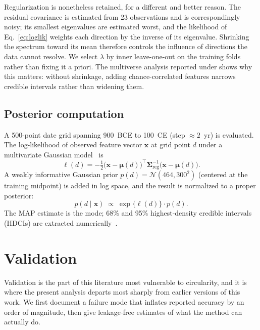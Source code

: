 \documentclass[10pt,letterpaper]{article}
\newcommand{\Smat}{\boldsymbol{\Sigma}}
\newcommand{\muvec}{\boldsymbol{\mu}}
\newcommand{\xvec}{\mathbf{x}}
\begin{document}
Regularization is nonetheless retained, for a different and better reason.
The residual covariance is estimated from 23 observations and is
correspondingly noisy; its smallest eigenvalues are estimated worst, and
the likelihood of Eq.~\ref{eq:loglik} weights each direction by the inverse
of its eigenvalue.  Shrinking the spectrum toward its mean therefore
controls the influence of directions the data cannot resolve.  We select
$\lambda$ by inner leave-one-out on the training folds rather than fixing
it a priori.  The multiverse analysis reported under 
shows why this matters: without shrinkage, adding chance-correlated
features narrows credible intervals rather than widening them.

\subsection*{Posterior computation}

A 500-point date grid spanning 900~BCE to 100~CE (step $\approx 2$~yr)
is evaluated.  The log-likelihood of observed feature vector $\xvec$
at grid point $d$ under a multivariate Gaussian model~\cite{Bishop2006} is
%
\begin{equation}
  \ell(d) = -\tfrac{1}{2}
    \bigl(\xvec - \muvec(d)\bigr)^{\!\top}
    \Smat_{\text{reg}}^{-1}
    \bigl(\xvec - \muvec(d)\bigr).
  \label{eq:loglik}
\end{equation}
%
A weakly informative Gaussian prior $p(d) = \mathcal{N}(464, 300^2)$
(centered at the training midpoint) is added in log space, and the result
is normalized to a proper posterior:
%
\begin{equation}
  p(d \mid \xvec) \;\propto\; \exp\bigl\{\ell(d)\bigr\} \cdot p(d).
  \label{eq:posterior}
\end{equation}
%
The MAP estimate is the mode; 68\% and 95\% highest-density credible
intervals (HDCIs) are extracted numerically~\cite{Gelman2014}.

\section*{Validation}
\label{sec:validation}

Validation is the part of this literature most vulnerable to circularity,
and it is where the present analysis departs most sharply from earlier
versions of this work.  We first document a failure mode that inflates
reported accuracy by an order of magnitude, then give leakage-free
estimates of what the method can actually do.
\end{document}
